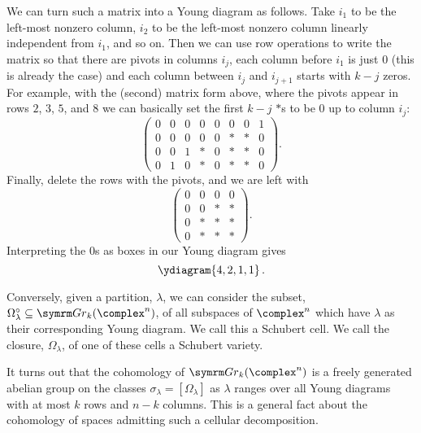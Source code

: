 We can turn such a matrix into a Young diagram as follows.
Take \(i_1\) to be the left-most nonzero column, \(i_2\) to be the left-most nonzero column linearly independent from \(i_1\), and so on.
Then we can use row operations to write the matrix so that there are pivots in columns \(i_j\), each column before \(i_1\) is just \(0\) (this is already the case) and each column between \(i_j\) and \(i_{j+1}\) starts with \(k - j\) zeros.
For example, with the (second) matrix form above, where the pivots appear in rows \(2\), \(3\), \(5\), and \(8\) we can basically set the first \(k - j\) \(*\)s to be \(0\) up to column \(i_j\):
\begin{equation}
    \begin{pmatrix}
        0 & 0 & 0 & 0 & 0 & 0 & 0 & 1\\
        0 & 0 & 0 & 0 & 0 & * & * & 0\\
        0 & 0 & 1 & * & 0 & * & * & 0\\
        0 & 1 & 0 & * & 0 & * & * & 0
    \end{pmatrix}
    .
\end{equation}
Finally, delete the rows with the pivots, and we are left with
\begin{equation}
    \begin{pmatrix}
        0 & 0 & 0 & 0\\
        0 & 0 & * & *\\
        0 & * & * & *\\
        0 & * & * & *
    \end{pmatrix}
    .
\end{equation}
Interpreting the \(0\)s as boxes in our Young diagram gives
\begin{equation}
    \ydiagram{4,2,1,1}\,.
\end{equation}

Conversely, given a partition, \(\lambda\), we can consider the subset, \(\Omega_\lambda^{\circ} \subseteq \Gr_k(\complex^n)\), of all subspaces of \(\complex^n\) which have \(\lambda\) as their corresponding Young diagram.
We call this a Schubert cell.
We call the closure, \(\Omega_\lambda\), of one of these cells a Schubert variety.

It turns out that the cohomology of \(\Gr_k(\complex^n)\) is a freely generated abelian group on the classes \(\sigma_\lambda = [\Omega_\lambda]\) as \(\lambda\) ranges over all Young diagrams with at most \(k\) rows and \(n - k\) columns.
This is a general fact about the cohomology of spaces admitting such a cellular decomposition.

